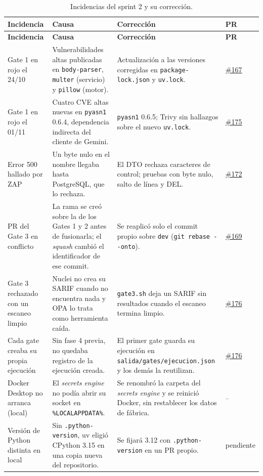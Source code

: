 \documentclass[11pt,a4paper]{report}
\newcommand{\pr}[1]{\href{https://github.com/PracticasESPE/Framework_Desarrollo_Seguro/pull/#1}{\##1}}
\begin{document}
{\small
\begin{longtable}{@{}P{3.3cm}P{4.5cm}P{5.0cm}P{1.2cm}@{}}
\caption{Incidencias del sprint 2 y su corrección.}\\
\toprule
\textbf{Incidencia} & \textbf{Causa} & \textbf{Corrección} & \textbf{PR}\\
\midrule
\endfirsthead
\toprule
\textbf{Incidencia} & \textbf{Causa} & \textbf{Corrección} & \textbf{PR}\\
\midrule
\endhead
Gate 1 en rojo el 24/10 & Vulnerabilidades altas publicadas en \texttt{body-parser}, \texttt{multer} (servicio) y \texttt{pillow} (motor). & Actualización a las versiones corregidas en \texttt{package-lock.json} y \texttt{uv.lock}. & \pr{167}\\
Gate 1 en rojo el 01/11 & Cuatro CVE altas nuevas en \texttt{pyasn1} 0.6.4, dependencia indirecta del cliente de Gemini. & \texttt{pyasn1} 0.6.5; Trivy sin hallazgos sobre el nuevo \texttt{uv.lock}. & \pr{175}\\
Error 500 hallado por ZAP & Un byte nulo en el nombre llegaba hasta PostgreSQL, que lo rechaza. & El DTO rechaza caracteres de control; pruebas con byte nulo, salto de línea y DEL. & \pr{172}\\
PR del Gate 3 en conflicto & La rama se creó sobre la de los Gates 1 y 2 antes de fusionarla; el \emph{squash} cambió el identificador de ese commit. & Se reaplicó solo el commit propio sobre \texttt{dev} (\texttt{git rebase -{}-onto}). & \pr{169}\\
Gate 3 rechazado con un escaneo limpio & Nuclei no crea su SARIF cuando no encuentra nada y OPA lo trata como herramienta caída. & \texttt{gate3.sh} deja un SARIF sin resultados cuando el escaneo termina limpio. & \pr{176}\\
Cada gate creaba su propia ejecución & Sin fase 4 previa, no quedaba registro de la ejecución creada. & El primer gate guarda su ejecución en \texttt{salida/gates/ejecucion.json} y los demás la reutilizan. & \pr{176}\\
Docker Desktop no arranca (local) & El \emph{secrets engine} no podía abrir su socket en \texttt{\%LOCALAPPDATA\%}. & Se renombró la carpeta del \emph{secrets engine} y se reinició Docker, sin restablecer los datos de fábrica. & --\\
Versión de Python distinta en local & Sin \texttt{.python-version}, uv eligió CPython 3.15 en una copia nueva del repositorio. & Se fijará 3.12 con \texttt{.python-version} en un PR propio. & pendiente\\
\bottomrule
\end{longtable}}
\end{document}
